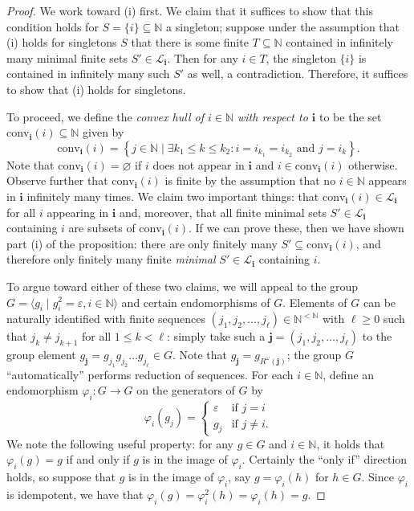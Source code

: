 \documentclass[10pt,a4paper]{amsart}
\newcommand{\NN}{\mathbb{N}}
\begin{document}
\begin{proof}
    We work toward (i) first. We claim that it suffices to show that this condition holds for $S=\{i\}\subseteq\NN$ a singleton; suppose under the assumption that (i) holds for singletons $S$ that there is some finite $T\subseteq\NN$ contained in infinitely many minimal finite sets $S'\in\mathcal L_\mathbf i$. Then for any $i\in T$, the singleton $\{i\}$ is contained in infinitely many such $S'$ as well, a contradiction. Therefore, it suffices to show that (i) holds for singletons.

    To proceed, we define the \emph{convex hull of $i\in\NN$ with respect to $\mathbf i$} to be the set $\text{conv}_\mathbf i(i)\subseteq\NN$ given by
    $$\text{conv}_\mathbf i(i)=\left\{j\in\NN\mid\exists k_1\leq k\leq k_2:i=i_{k_1}=i_{k_2}\text{ and }j=i_k\right\}.$$
    Note that $\text{conv}_\mathbf i(i)=\varnothing$ if $i$ does not appear in $\mathbf i$ and $i\in\text{conv}_\mathbf i(i)$ otherwise. Observe further that $\text{conv}_\mathbf i(i)$ is finite by the assumption that no $i\in\NN$ appears in $\mathbf i$ infinitely many times. We claim two important things: that $\text{conv}_\mathbf i(i)\in\mathcal L_\mathbf i$ for all $i$ appearing in $\mathbf i$ and, moreover, that all finite minimal sets $S'\in\mathcal L_\mathbf i$ containing $i$ are subsets of $\text{conv}_\mathbf i(i)$. If we can prove these, then we have shown part (i) of the proposition: there are only finitely many $S'\subseteq\text{conv}_\mathbf i(i)$, and therefore only finitely many finite \emph{minimal} $S'\in\mathcal L_\mathbf i$ containing $i$.

    To argue toward either of these two claims, we will appeal to the group $G=\langle g_i\mid g_i^2=\varepsilon,i\in\NN\rangle$ and certain endomorphisms of $G$. Elements of $G$ can be naturally identified with finite sequences $(j_1,j_2,\dots,j_\ell)\in\NN^{<\NN}$ with $\ell\geq0$ such that $j_k\neq j_{k+1}$ for all $1\leq k<\ell$: simply take such a $\mathbf j=(j_1,j_2,\dots,j_\ell)$ to the group element $g_\mathbf j=g_{j_1}g_{j_2}\dots g_{j_\ell}\in G$. Note that $g_\mathbf j=g_{R^\omega(\mathbf j)}$; the group $G$ ``automatically'' performs reduction of sequences. For each $i\in\NN$, define an endomorphism $\varphi_i:G\to G$ on the generators of $G$ by
    $$\varphi_i(g_j)=\begin{cases}
        \varepsilon & \text{if }j=i\\
        g_j & \text{if }j\neq i.
    \end{cases}$$
    We note the following useful property: for any $g\in G$ and $i\in\NN$, it holds that $\varphi_i(g)=g$ if and only if $g$ is in the image of $\varphi_i$. Certainly the ``only if'' direction holds, so suppose that $g$ is in the image of $\varphi_i$, say $g=\varphi_i(h)$ for $h\in G$. Since $\varphi_i$ is idempotent, we have that $\varphi_i(g)=\varphi_i^2(h)=\varphi_i(h)=g$.
    

\end{proof}
\end{document}
